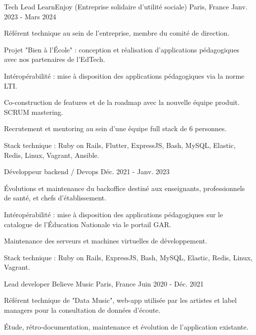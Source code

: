 \begin{cventries}
  \cventry
    {Tech Lead}
    {LearnEnjoy (Entreprise solidaire d'utilité sociale)}
    {Paris, France}
    {Janv. 2023 - Mars 2024}
    {
      \begin{cvitems}
        \item {Référent technique au sein de l'entreprise, membre du comité de direction.}
        \item {Projet "Bien à l'École" : conception et réalisation d'applications pédagogiques avec nos partenaires de l'EdTech.}
        \item {Intéropérabilité : mise à disposition des applications pédagogiques via la norme LTI.}
        \item {Co-construction de features et de la roadmap avec la nouvelle équipe produit. SCRUM mastering.}
        \item {Recrutement et mentoring au sein d'une équipe full stack de 6 personnes.}
        \item {Stack technique : Ruby on Rails, Flutter, ExpressJS, Bash, MySQL, Elastic, Redis, Linux, Vagrant, Ansible.}
      \end{cvitems}
      \vspace{-2.0mm}
    }
  \cventry
    {Développeur backend / Devops}
    {}
    {}
    {Déc. 2021 - Janv. 2023}
    {
      \begin{cvitems}
        \item {Évolutions et maintenance du backoffice destiné aux enseignants, professionnels de santé, et chefs d'établissement.}
        \item {Intéropérabilité : mise à disposition des applications pédagogiques sur le catalogue de l'Éducation Nationale via le portail GAR.}
        \item {Maintenance des serveurs et machines virtuelles de développement.}
        \item {Stack technique : Ruby on Rails, ExpressJS, Bash, MySQL, Elastic, Redis, Linux, Vagrant.}
      \end{cvitems}
    }
  \cventry
    {Lead developer}
    {Believe Music}
    {Paris, France}
    {Juin 2020 - Déc. 2021}
    {
      \begin{cvitems}
        \item {Référent technique de "Data Music", web-app utilisée par les artistes et label managers pour la consultation de données d'écoute.}
        \item {Étude, rétro-documentation, maintenance et évolution de l'application existante.}

\end{cvitems}}
\end{cventries}
